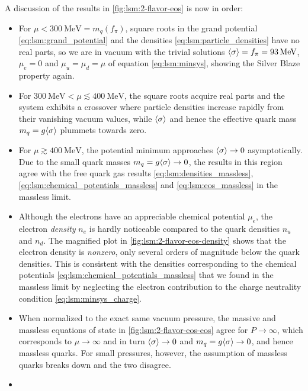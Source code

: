 A discussion of the results in \cref{fig:lsm:2-flavor-eos} is now in order:
\begin{itemize}
\item For $\mu < \SI{300}{\mega\electronvolt} = m_q(f_\pi)$, square roots in the grand potential \eqref{eq:lsm:grand_potential} and the densities \eqref{eq:lsm:particle_densities} have no real parts, so we are in vacuum with the trivial solutions $\langle \sigma \rangle = f_\pi = \SI{93}{\mega\electronvolt}$, $\mu_e = 0$ and $\mu_u = \mu_d = \mu$ of equation \eqref{eq:lsm:minsys}, showing the Silver Blaze property again.
\item For $\SI{300}{\mega\electronvolt} < \mu \lesssim \SI{400}{\mega\electronvolt}$, the square roots acquire real parts and the system exhibits a crossover where particle densities increase rapidly from their vanishing vacuum values, while $\langle \sigma \rangle$ and hence the effective quark mass $m_q = g \langle \sigma \rangle$ plummets towards zero.
\item For $\mu \gtrsim \SI{400}{\mega\electronvolt}$, the potential minimum approaches $\langle \sigma \rangle \rightarrow 0$ asymptotically.
      Due to the small quark masses $m_q = g \langle \sigma \rangle \rightarrow 0$, the results in this region agree with the free quark gas results \eqref{eq:lsm:densities_massless}, \eqref{eq:lsm:chemical_potentials_massless} and \eqref{eq:lsm:eos_massless} in the massless limit.
\item Although the electrons have an appreciable chemical potential $\mu_e$, the electron \emph{density} $n_e$ is hardly noticeable compared to the quark densities $n_u$ and $n_d$.
      The magnified plot in \cref{fig:lsm:2-flavor-eos-density} shows that the electron density is \emph{nonzero}, only several orders of magnitude below the quark densities.
      This is consistent with the densities corresponding to the chemical potentials \eqref{eq:lsm:chemical_potentials_massless} that we found in the massless limit by neglecting the electron contribution to the charge neutrality condition \eqref{eq:lsm:minsys_charge}.
\item When normalized to the exact same vacuum pressure, the massive and massless equations of state in \cref{fig:lsm:2-flavor-eos-eos} agree for $P \rightarrow \infty$, which corresponds to $\mu \rightarrow \infty$ and in turn $\langle \sigma \rangle \rightarrow 0$ and $m_q = g \langle \sigma \rangle \rightarrow 0$, and hence massless quarks.
      For small pressures, however, the assumption of massless quarks breaks down and the two disagree.
\item {}
\end{itemize}

